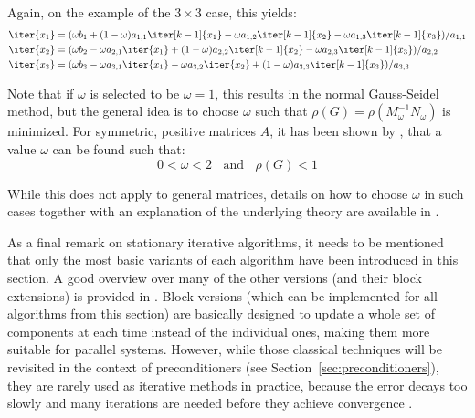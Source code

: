 \noindent Again, on the example of the $3 \times 3$ case, this yields:
\begin{equation}
\label{eqn:sor}
   \begin{aligned}
    \iter{x_1} & =  (\omega b_1 +(1-\omega)a_{1,1}\iter[k-1]{x_1} -\omega a_{1,2}\iter[k-1]{x_2} - \omega a_{1,3}\iter[k-1]{x_3})/a_{1,1} \\
    \iter{x_2} & =  (\omega b_2 -\omega a_{2,1}\iter{x_1} +(1-\omega) a_{2,2}\iter[k-1]{x_2} - \omega a_{2,3}\iter[k-1]{x_3})/a_{2,2} \\
    \iter{x_3} & =  (\omega b_3 -\omega a_{3,1}\iter{x_1} -\omega a_{3,2}\iter{x_2} + (1-\omega) a_{3,3}\iter[k-1]{x_3})/a_{3,3} \\
\end{aligned} 
\end{equation}

\noindent Note that if $\omega$ is selected to be $\omega = 1$, this results in the normal Gauss-Seidel method, but the general idea is to choose $\omega$ such that $\rho(G)=\rho(M^{-1}_\omega N_\omega)$ is minimized. For symmetric, positive matrices $A$, it has been shown by \cite{young_convergence_1970}, that a value $\omega$ can be found such that:
\begin{equation}
       0<\omega<2 \;\;\text{ and }\;\; \rho(G)<1
\end{equation}

\noindent While this does not apply to general matrices, details on how to choose $\omega$ in such cases together with an explanation of the underlying theory are available in \cite{greenbaum_iterative_1997}.

As a final remark on stationary iterative algorithms, it needs to be mentioned that only the most basic variants of each algorithm have been introduced in this section. A good overview over many of the other versions (and their block extensions) is provided in \cite{saad_iterative_2003}. Block versions (which can be implemented for all algorithms from this section) are basically designed to update a whole set of components at each time instead of the individual ones, making them more suitable for parallel systems. However, while those classical techniques will be revisited in the context of preconditioners (see Section~\hyperref[sec:preconditioners]{\ref{sec:preconditioners}}), they are rarely used as iterative methods in practice, because the error decays too slowly and many iterations are needed before they achieve convergence \cite{strang_introduction_2009}.




